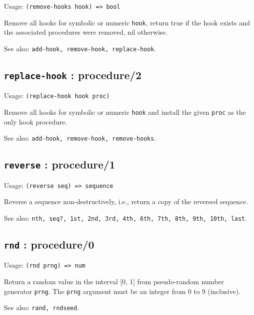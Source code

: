 \documentclass[
]{article}
\newcommand{\passthrough}[1]{#1}
\begin{document}
Usage: \passthrough{\lstinline!(remove-hooks hook) => bool!}

Remove all hooks for symbolic or numeric \passthrough{\lstinline!hook!},
return true if the hook exists and the associated procedures were
removed, nil otherwise.

See also: \passthrough{\lstinline!add-hook, remove-hook, replace-hook!}.

\hypertarget{replace-hook-procedure2-1}{%
\subsection{\texorpdfstring{\texttt{replace-hook} :
procedure/2}{replace-hook : procedure/2}}\label{replace-hook-procedure2-1}}

Usage: \passthrough{\lstinline!(replace-hook hook proc)!}

Remove all hooks for symbolic or numeric \passthrough{\lstinline!hook!}
and install the given \passthrough{\lstinline!proc!} as the only hook
procedure.

See also: \passthrough{\lstinline!add-hook, remove-hook, remove-hooks!}.

\hypertarget{reverse-procedure1-1}{%
\subsection{\texorpdfstring{\texttt{reverse} :
procedure/1}{reverse : procedure/1}}\label{reverse-procedure1-1}}

Usage: \passthrough{\lstinline!(reverse seq) => sequence!}

Reverse a sequence non-destructively, i.e., return a copy of the
reversed sequence.

See also:
\passthrough{\lstinline!nth, seq?, 1st, 2nd, 3rd, 4th, 6th, 7th, 8th, 9th, 10th, last!}.

\hypertarget{rnd-procedure0-1}{%
\subsection{\texorpdfstring{\texttt{rnd} :
procedure/0}{rnd : procedure/0}}\label{rnd-procedure0-1}}

Usage: \passthrough{\lstinline!(rnd prng) => num!}

Return a random value in the interval {[}0, 1{]} from pseudo-random
number generator \passthrough{\lstinline!prng!}. The
\passthrough{\lstinline!prng!} argument must be an integer from 0 to 9
(inclusive).

See also: \passthrough{\lstinline!rand, rndseed!}.
\end{document}
